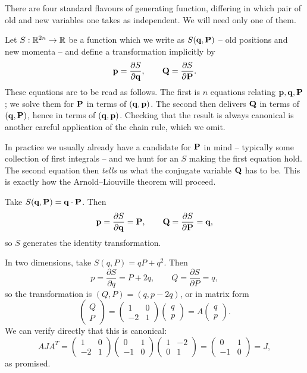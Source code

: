\documentclass[a4paper]{scrartcl}
\begin{document}
There are four standard flavours of generating function, differing in which pair of old and new variables one takes as independent. We will need only one of them.

Let $S : \mathbb{R}^{2n}\to\mathbb{R}$ be a function which we write as $S(\mathbf{q}, \mathbf{P})$ -- old positions and new momenta -- and define a transformation implicitly by
$$
\mathbf{p} = \frac{\partial S}{\partial \mathbf{q}}, \qquad \mathbf{Q} = \frac{\partial S}{\partial \mathbf{P}}.
$$
These equations are to be read as follows. The first is $n$ equations relating $\mathbf{p}, \mathbf{q}, \mathbf{P}$; we solve them for $\mathbf{P}$ in terms of $(\mathbf{q}, \mathbf{p})$. The second then delivers $\mathbf{Q}$ in terms of $(\mathbf{q}, \mathbf{P})$, hence in terms of $(\mathbf{q}, \mathbf{p})$. Checking that the result is always canonical is another careful application of the chain rule, which we omit.

In practice we usually already have a candidate for $\mathbf{P}$ in mind -- typically some collection of first integrals -- and we hunt for an $S$ making the first equation hold. The second equation then \emph{tells} us what the conjugate variable $\mathbf{Q}$ has to be. This is exactly how the Arnold--Liouville theorem will proceed.

\begin{example}
	Take $S(\mathbf{q}, \mathbf{P}) = \mathbf{q}\cdot \mathbf{P}$. Then
	$$
	\mathbf{p} = \frac{\partial S}{\partial \mathbf{q}} = \mathbf{P}, \qquad \mathbf{Q} = \frac{\partial S}{\partial \mathbf{P}} = \mathbf{q},
	$$
	so $S$ generates the identity transformation.
\end{example}

\begin{example}
	In two dimensions, take $S(q, P) = qP + q^2$. Then
	$$
	p = \frac{\partial S}{\partial q} = P + 2q, \qquad Q = \frac{\partial S}{\partial P} = q,
	$$
	so the transformation is $(Q,P) = (q, p-2q)$, or in matrix form
	$$
	\begin{pmatrix}Q\\P\end{pmatrix} = \begin{pmatrix}1 & 0\\ -2 & 1\end{pmatrix}\begin{pmatrix}q\\p\end{pmatrix} = A \begin{pmatrix}q\\p\end{pmatrix}.
	$$
	We can verify directly that this is canonical:
	$$
	AJA^T = \begin{pmatrix}1&0\\-2&1\end{pmatrix}\begin{pmatrix}0&1\\-1&0\end{pmatrix}\begin{pmatrix}1&-2\\0&1\end{pmatrix} = \begin{pmatrix}0&1\\-1&0\end{pmatrix} = J,
	$$
	as promised.
\end{example}
\end{document}

